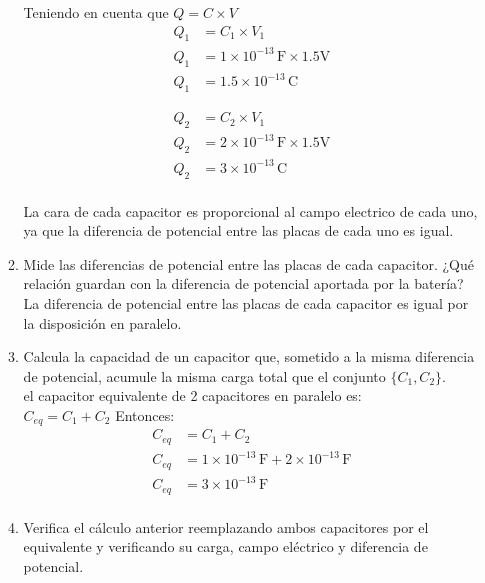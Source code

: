 \documentclass[12pt]{report}
\begin{document}
\begin{enumerate}
\begin{enumerate}
            Teniendo en cuenta que $Q=C \times V$\\
            
            \begin{align*}
            Q_1&= C_1 \times V_1\\[6pt]
            Q_1&= 1 \times 10^{-13} \,\text{F} \times 1.5 \text{V}\\[6pt]
            Q_1&= 1.5\times 10^{-13} \,\text{C}
            \end{align*}


            \begin{align*}
            Q_2&= C_2 \times V_1\\[6pt]
            Q_2&= 2 \times 10^{-13} \,\text{F} \times 1.5 \text{V}\\[6pt]
            Q_2&= 3\times 10^{-13} \,\text{C}\\[12pt] 
            \end{align*}

            La cara de cada capacitor es proporcional al campo electrico de cada uno, ya que la diferencia de potencial entre las placas de cada uno es igual.\\

        \item Mide las diferencias de potencial entre las placas de cada capacitor. ¿Qué relación guardan con la diferencia de potencial aportada por la batería?
            La diferencia de potencial entre las placas de cada capacitor es igual por la disposición en paralelo.\\
        \item Calcula la capacidad de un capacitor que, sometido a la misma diferencia de potencial, acumule la misma carga total que el conjunto $\{C_1, C_2\}$.\\
            el capacitor equivalente de 2 capacitores en paralelo es:\\
            $C_{eq}=C_1+C_2$ Entonces:\\

            \begin{align*}
                C_{eq}&=C_1+C_2\\[6pt]
                C_{eq}&= 1 \times 10^{-13} \, \text{F} +  2 \times 10^{-13} \, \text{F}\\[6pt]
                C_{eq}&= 3\times 10^{-13} \, \text{F}\\[12pt]
            \end{align*}


        \item Verifica el cálculo anterior reemplazando ambos capacitores por el equivalente y verificando su carga, campo eléctrico y diferencia de potencial.


\end{enumerate}
\end{enumerate}
\end{document}
